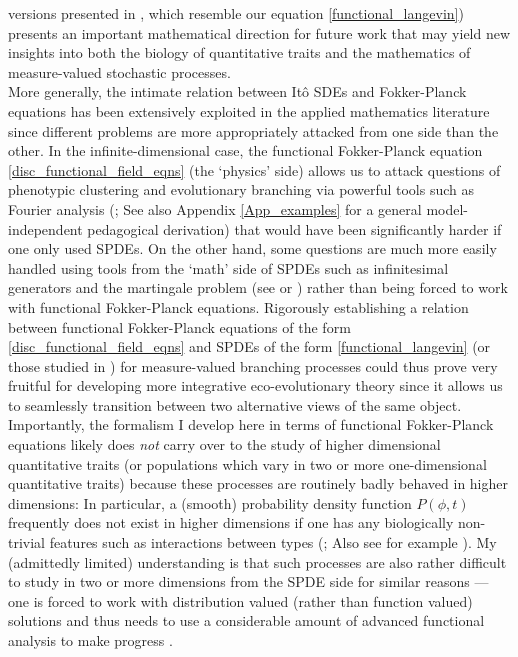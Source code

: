 versions presented in \cite{week_white_2021}, which resemble our equation \eqref{functional_langevin}) presents an important mathematical direction for future work that may yield new insights into both the biology of quantitative traits and the mathematics of measure-valued stochastic processes.\\
More generally, the intimate relation between It\^o SDEs and Fokker-Planck equations has been extensively exploited in the applied mathematics literature \citep{van_kampen_stochastic_1981,oksendal_stochastic_1998, gardiner_stochastic_2009} since different problems are more appropriately attacked from one side than the other. In the infinite-dimensional case, the functional Fokker-Planck equation \eqref{disc_functional_field_eqns} (the `physics' side) allows us to attack questions of phenotypic clustering and evolutionary branching via powerful tools such as Fourier analysis (\cite{rogers_demographic_2012, rogers_modes_2015}; See also Appendix \ref{App_examples} for a general model-independent pedagogical derivation) that would have been significantly harder if one only used SPDEs. On the other hand, some questions are much more easily handled using tools from the `math' side of SPDEs such as infinitesimal generators and the martingale problem (see \cite{champagnat_unifying_2006} or \cite{week_white_2021}) rather than being forced to work with functional Fokker-Planck equations. Rigorously establishing a relation between functional Fokker-Planck equations of the form \eqref{disc_functional_field_eqns} and SPDEs of the form \eqref{functional_langevin} (or those studied in \cite{week_white_2021}) for measure-valued branching processes could thus prove very fruitful for developing more integrative eco-evolutionary theory since it allows us to seamlessly transition between two alternative views of the same object. Importantly, the formalism I develop here in terms of functional Fokker-Planck equations likely does \emph{not} carry over to the study of higher dimensional quantitative traits (or populations which vary in two or more one-dimensional quantitative traits) because these processes are routinely badly behaved in higher dimensions: In particular, a (smooth) probability density function $P(\phi,t)$ frequently does not exist in higher dimensions if one has any biologically non-trivial features such as interactions between types (\cite{fleming_measure-valued_1979, walsh_introduction_1986}; Also see for example \cite{evans_measure-valued_1994}). My (admittedly limited) understanding is that such processes are also rather difficult to study in two or more dimensions from the SPDE side for similar reasons --- one is forced to work with distribution valued (rather than function valued) solutions and thus needs to use a considerable amount of advanced functional analysis to make progress \citep{walsh_introduction_1986,carmona_stochastic_1999,balan_gentle_2018}.\\
